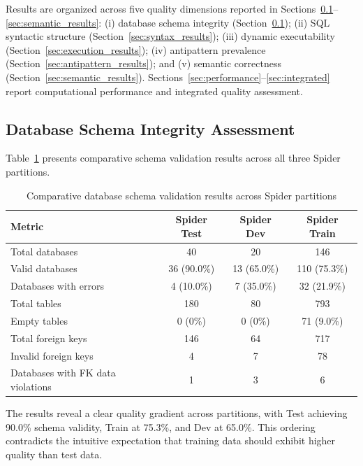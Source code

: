 \documentclass[print]{einformatica}
\begin{document}
Results are organized across five quality dimensions reported in Sections~\ref{sec:schema_results}--\ref{sec:semantic_results}: (i) database schema integrity (Section~\ref{sec:schema_results}); (ii) SQL syntactic structure (Section~\ref{sec:syntax_results}); (iii) dynamic executability (Section~\ref{sec:execution_results}); (iv) antipattern prevalence (Section~\ref{sec:antipattern_results}); and (v) semantic correctness (Section~\ref{sec:semantic_results}). Sections~\ref{sec:performance}--\ref{sec:integrated} report computational performance and integrated quality assessment.

\subsection{Database Schema Integrity Assessment}\label{sec:schema_results}

Table~\ref{tab:schema_overall} presents comparative schema validation results across all three Spider partitions.

\begin{table}[ht]
    \caption{Comparative database schema validation results across Spider partitions}
    \label{tab:schema_overall}
    \centering
    \footnotesize
    \begin{tabular}{lccc}
        \toprule
        \textbf{Metric} & \textbf{Spider Test} & \textbf{Spider Dev} & \textbf{Spider Train} \\
        \midrule
        Total databases & 40 & 20 & 146 \\
        Valid databases & 36 (90.0\%) & 13 (65.0\%) & 110 (75.3\%) \\
        Databases with errors & 4 (10.0\%) & 7 (35.0\%) & 32 (21.9\%) \\
        Total tables & 180 & 80 & 793 \\
        Empty tables & 0 (0\%) & 0 (0\%) & 71 (9.0\%) \\
        Total foreign keys & 146 & 64 & 717 \\
        Invalid foreign keys & 4 & 7 & 78 \\
        Databases with FK data violations & 1 & 3 & 6 \\
        \bottomrule
    \end{tabular}
\end{table}

The results reveal a clear quality gradient across partitions, with Test achieving 90.0\% schema validity, Train at 75.3\%, and Dev at 65.0\%. This ordering contradicts the intuitive expectation that training data should exhibit higher quality than test data.
\end{document}
